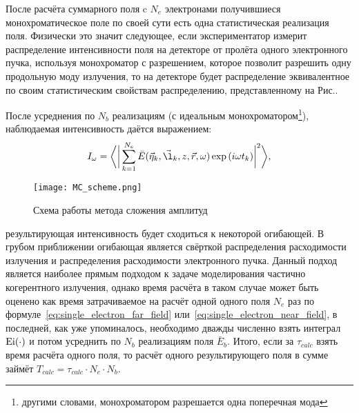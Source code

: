 После расчёта суммарного поля c $N_e$ электронами получившиеся монохроматическое поле по своей сути есть одна статистическая реализация поля.  Физически это значит следующее, если экспериментатор измерит распределение интенсивности поля на детекторе от пролёта одного электронного пучка, используя монохроматор с разрешением, которое позволит разрешить одну продольную моду излучения, то на детекторе будет распределение эквивалентное по своим статистическим свойствам распределению, представленному на Рис.. 

После усреднения по $N_b$ реализациям (с идеальным монохроматором\footnote{другими словами, монохроматором разрешается одна поперечная мода}), наблюдаемая интенсивность даётся выражением: 
\begin{align}
	I_{\omega} = \bigg \langle \bigg|\sum\limits_{k=1}^{N_e} \bar{E}(\vec{\eta}_k, \vec{\l}_k, z, \vec{r}, \omega) \exp{(i \omega t_k)}\bigg|^2 \bigg \rangle,
	\label{eq:I_MC} 
\end{align}
\begin{figure}[H] 
	\centering 	\texttt{[image: MC\_scheme.png]}
	\caption{Схема работы метода сложения амплитуд }
	\label{fig:SRW_scheme}
\end{figure}
\noindent результирующая интенсивность будет сходиться к некоторой огибающей. В грубом приближении огибающая является свёрткой распределения расходимости излучения и распределения расходимости электронного пучка. Данный подход является наиболее прямым подходом к задаче моделирования частично когерентного излучения, однако время расчёта в таком случае может быть оценено как время затрачиваемое на расчёт одной одного поля $N_e$ раз по формуле~\ref{eq:single_electron_far_field} или~\ref{eq:single_electron_near_field}, в последней, как уже упоминалось, необходимо дважды численно взять интеграл $\textup{Ei}(\cdot)$ и потом усреднить по $N_b$ реализациям поля $\bar{E}_{b}$. Итого, если за $\tau_{calc}$ взять время расчёта одного поля, то расчёт одного результирующего поля в сумме займёт $T_{calc} = \tau_{calc} \cdot N_e \cdot N_b$.

